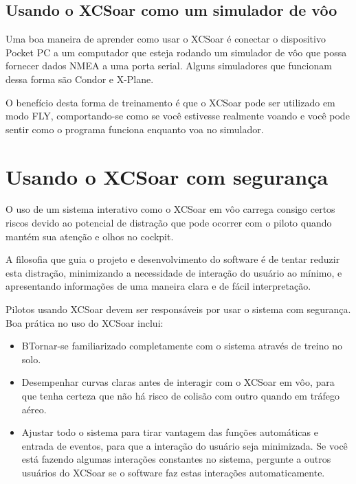 \subsection*{Usando o XCSoar como um simulador de vôo}
Uma boa maneira de aprender como usar o XCSoar é conectar o dispositivo Pocket PC a um computador que esteja rodando um simulador de vôo que possa fornecer dados NMEA a uma porta serial.  Alguns simuladores que funcionam dessa forma são Condor e X-Plane. 

O benefício desta forma de treinamento é que o XCSoar pode ser utilizado em modo FLY, comportando-se como se você estivesse realmente voando e você pode sentir como o programa funciona enquanto voa no simulador.

\section{Usando o XCSoar com segurança}\label{sec:usingxcsoarsafely}\label{conf:usingxcsoarsafely}
O uso de um sistema interativo como o XCSoar em vôo carrega consigo certos riscos devido ao potencial de distração que pode ocorrer com o piloto quando mantém sua atenção e olhos no cockpit.

A filosofia que guia o projeto e desenvolvimento do software é de tentar reduzir esta distração, minimizando a necessidade de interação do usuário ao mínimo, e apresentando informações de uma maneira clara e de fácil interpretação.

Pilotos usando XCSoar devem ser responsáveis por usar o sistema com segurança.  Boa prática no uso do XCSoar inclui:

\begin{itemize}
\item BTornar-se familiarizado completamente com o sistema através de treino no solo.
\item Desempenhar curvas claras antes de interagir com o XCSoar em vôo, para que tenha certeza que não há risco de colisão com outro quando em tráfego aéreo.
\item Ajustar todo o sistema para tirar vantagem das funções automáticas e entrada de eventos, para que a interação do usuário seja minimizada.  Se você está fazendo algumas interações constantes no sistema, pergunte a outros usuários do XCSoar se o software faz estas interações automaticamente.
 

\end{itemize}
